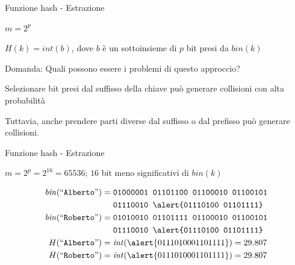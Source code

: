 \begin{frame}{Funzione hash - Estrazione}

\vspace{-9pt}
\begin{myboxtitle}[Estrazione]
\BIL
\item $m = 2^p$
\item $H(k) = \mathit{int}(b)$, dove $b$ è un sottoinsieme di $p$ bit presi da $\mathit{bin}(k)$
\EIL
\end{myboxtitle}

\begin{myboxtitle}[Problemi]
\begin{overprint}
\alert{Domanda}: Quali possono essere i problemi di questo approccio?
\BIL
\item Selezionare bit presi dal suffisso della chiave può generare collisioni
con alta probabilità
\item Tuttavia, anche prendere parti diverse dal suffisso o dal prefisso può generare collisioni.
\EIL
\end{overprint}
\end{myboxtitle}
 
\end{frame}

\begin{frame}{Funzione hash - Estrazione}

\vspace{-9pt}
\begin{myboxtitle}[Esempio 1]
$m = 2^p = 2^{16} = 65536$; $16$ bit meno significativi di $\mathit{bin}(k)$

\begin{align*}
\mathit{bin}(``\texttt{Alberto}") = {} & \texttt{01000001  01101100  01100010  01100101} \\ 
&  \texttt{01110010  \alert{01110100  01101111}}\\
\mathit{bin}(``\texttt{Roberto}") = {} & \texttt{01010010  01101111  01100010  01100101} \\
&    \texttt{01110010  \alert{01110100  01101111}} \\
H(``\texttt{Alberto}") = {} & \mathit{int}(\alert{01110100  01101111}) = 29.807 \\
H(``\texttt{Roberto}") = {} & \mathit{int}(\alert{01110100  01101111}) = 29.807
\end{align*}
\end{myboxtitle}


\end{frame}


